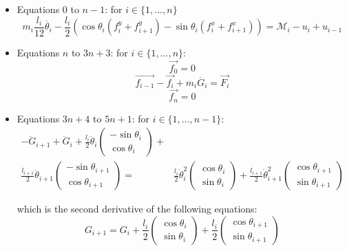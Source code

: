 \documentclass{article}
\begin{document}
\begin{itemize}
    \item Equations $0$ to $n-1$: for $i \in \{1, ..., n\}$
    \begin{equation}
        m_i \frac{l_i}{12} \ddot{\theta_i} - \frac{l_i}{2} \left(  \cos\theta_i (f_i^y + f_{i+1}^y) - \sin\theta_i (f_i^x + f_{i+1}^x) \right)= \mathcal{M}_i - u_i + u_{i-1}
    \end{equation}
    
    \item Equations $n$ to $3n+3$: for $i \in \{1, ..., n\}$:
    \begin{equation}
        \vec{f_0} = 0
    \end{equation}
    \begin{equation}
        \vec{f_{i-1}} - \vec{f_i} + m_i \ddot{G_i} = \vec{F_i}
    \end{equation}
    \begin{equation}
        \vec{f_n} = 0
    \end{equation}
    
    \item Equations $3n+4$ to $5n+1$: for $i \in \{1, ..., n-1\}$:
    \begin{equation}
    \begin{split}
    -\ddot{G}_{i+1} + \ddot{G}_{i} + \frac{l_i}{2} \ddot{\theta}_{i} \begin{pmatrix}
        -\sin \theta_{i} \\
        \cos \theta_{i} 
    \end{pmatrix} + \\ \frac{l_{i+1}}{2} \ddot{\theta}_{i+1} \begin{pmatrix}
        -\sin \theta_{i+1} \\
        \cos \theta_{i+1} 
    \end{pmatrix} =  
    & \frac{l_i}{2} \dot{\theta}_{i}^2 \begin{pmatrix}
        \cos \theta_{i} \\
        \sin \theta_{i} 
    \end{pmatrix} + \frac{l_{i+1}}{2} \dot{\theta}_{i+1}^2 \begin{pmatrix}
        \cos \theta_{i+1} \\
        \sin \theta_{i+1} 
    \end{pmatrix}
    \end{split}
    \end{equation}
    
    which is the second derivative of the following equations:
    \begin{equation}
        G_{i+1} = G_i + \frac{l_i}{2} \begin{pmatrix}
        \cos \theta_{i} \\
        \sin \theta_{i} 
    \end{pmatrix} + \frac{l_i}{2} \begin{pmatrix}
        \cos \theta_{i+1} \\
        \sin \theta_{i+1} 
    \end{pmatrix}
    \end{equation}

\end{itemize}
\end{document}
